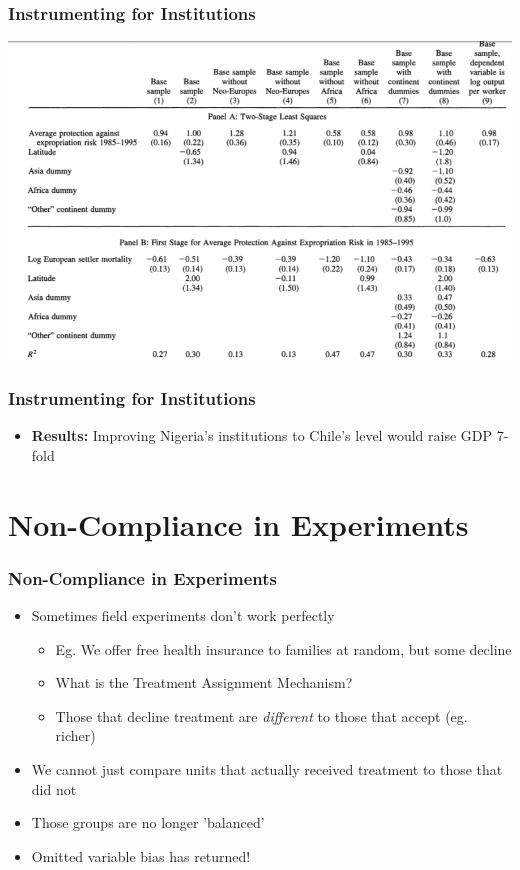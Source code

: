 \documentclass[xcolor=x11names,compress]{beamer}\usepackage[]{graphicx}\usepackage[]{color}
\renewcommand{\(}{\begin{columns}}
\renewcommand{\)}{\end{columns}}
\newcommand{\<}[1]{\begin{column}{#1}}
\renewcommand{\>}{\end{column}}
\begin{document}
\begin{frame}
\frametitle{Instrumenting for Institutions}
\includegraphics[scale=0.36]{AJR_results.png}
\end{frame}

\begin{frame}
\frametitle{Instrumenting for Institutions}
\begin{itemize}
\item \textbf{Results:} Improving Nigeria's institutions to Chile's level would raise GDP 7-fold
\end{itemize}
\end{frame}

\section{Non-Compliance in Experiments}

\begin{frame}
\frametitle{Non-Compliance in Experiments}
\begin{itemize}
\item Sometimes field experiments don't work perfectly
\pause
\begin{itemize}
\item Eg. We offer free health insurance to families at random, but some decline
\pause
\item What is the Treatment Assignment Mechanism?
\pause
\item Those that decline treatment are \textit{different} to those that accept (eg. richer)
\pause
\end{itemize}
\item We cannot just compare units that actually received treatment to those that did not
\pause
\item Those groups are no longer 'balanced'
\pause
\item Omitted variable bias has returned!
\end{itemize}
\end{frame}
\end{document}
